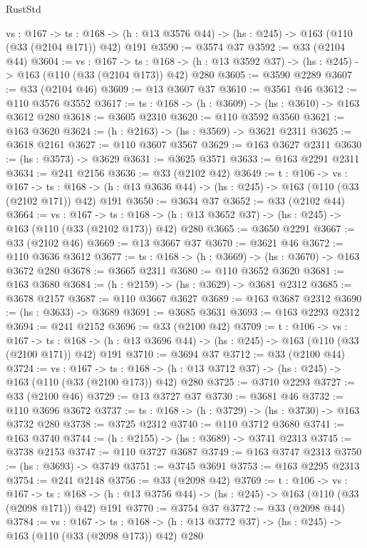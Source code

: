 \begin{lexlean}{RustStd}
\begin{coremodule}
  {vs : @167} ->
  {ts : @168} -> (h : @13 @3576 @44) -> (hs : @245) -> @163 (@110 (@33 (@2104 @171)) @42) @191
@3590 := @3574 @37
@3592 := @33 (@2104 @44)
@3604 := {vs : @167} ->
  {ts : @168} -> (h : @13 @3592 @37) -> (hs : @245) -> @163 (@110 (@33 (@2104 @173)) @42) @280
@3605 := @3590 @2289
@3607 := @33 (@2104 @46)
@3609 := @13 @3607 @37
@3610 := @3561 @46
@3612 := @110 @3576 @3552
@3617 := {ts : @168} -> (h : @3609) -> (hs : @3610) -> @163 @3612 @280
@3618 := @3605 @2310
@3620 := @110 @3592 @3560
@3621 := @163 @3620
@3624 := (h : @2163) -> (hs : @3569) -> @3621 @2311
@3625 := @3618 @2161
@3627 := @110 @3607 @3567
@3629 := @163 @3627 @2311
@3630 := (hs : @3573) -> @3629
@3631 := @3625 @3571
@3633 := @163 @2291 @2311
@3634 := @241 @2156
@3636 := @33 (@2102 @42)
@3649 := {t : @106} ->
  {vs : @167} ->
  {ts : @168} -> (h : @13 @3636 @44) -> (hs : @245) -> @163 (@110 (@33 (@2102 @171)) @42) @191
@3650 := @3634 @37
@3652 := @33 (@2102 @44)
@3664 := {vs : @167} ->
  {ts : @168} -> (h : @13 @3652 @37) -> (hs : @245) -> @163 (@110 (@33 (@2102 @173)) @42) @280
@3665 := @3650 @2291
@3667 := @33 (@2102 @46)
@3669 := @13 @3667 @37
@3670 := @3621 @46
@3672 := @110 @3636 @3612
@3677 := {ts : @168} -> (h : @3669) -> (hs : @3670) -> @163 @3672 @280
@3678 := @3665 @2311
@3680 := @110 @3652 @3620
@3681 := @163 @3680
@3684 := (h : @2159) -> (hs : @3629) -> @3681 @2312
@3685 := @3678 @2157
@3687 := @110 @3667 @3627
@3689 := @163 @3687 @2312
@3690 := (hs : @3633) -> @3689
@3691 := @3685 @3631
@3693 := @163 @2293 @2312
@3694 := @241 @2152
@3696 := @33 (@2100 @42)
@3709 := {t : @106} ->
  {vs : @167} ->
  {ts : @168} -> (h : @13 @3696 @44) -> (hs : @245) -> @163 (@110 (@33 (@2100 @171)) @42) @191
@3710 := @3694 @37
@3712 := @33 (@2100 @44)
@3724 := {vs : @167} ->
  {ts : @168} -> (h : @13 @3712 @37) -> (hs : @245) -> @163 (@110 (@33 (@2100 @173)) @42) @280
@3725 := @3710 @2293
@3727 := @33 (@2100 @46)
@3729 := @13 @3727 @37
@3730 := @3681 @46
@3732 := @110 @3696 @3672
@3737 := {ts : @168} -> (h : @3729) -> (hs : @3730) -> @163 @3732 @280
@3738 := @3725 @2312
@3740 := @110 @3712 @3680
@3741 := @163 @3740
@3744 := (h : @2155) -> (hs : @3689) -> @3741 @2313
@3745 := @3738 @2153
@3747 := @110 @3727 @3687
@3749 := @163 @3747 @2313
@3750 := (hs : @3693) -> @3749
@3751 := @3745 @3691
@3753 := @163 @2295 @2313
@3754 := @241 @2148
@3756 := @33 (@2098 @42)
@3769 := {t : @106} ->
  {vs : @167} ->
  {ts : @168} -> (h : @13 @3756 @44) -> (hs : @245) -> @163 (@110 (@33 (@2098 @171)) @42) @191
@3770 := @3754 @37
@3772 := @33 (@2098 @44)
@3784 := {vs : @167} ->
  {ts : @168} -> (h : @13 @3772 @37) -> (hs : @245) -> @163 (@110 (@33 (@2098 @173)) @42) @280

\end{coremodule}
\end{lexlean}
